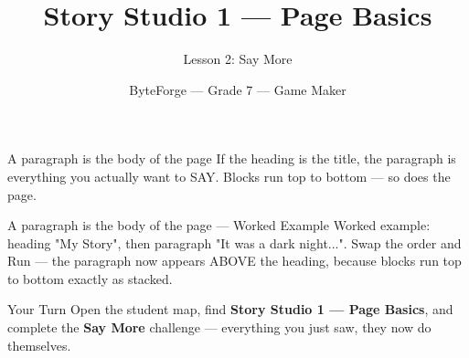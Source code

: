 \documentclass[aspectratio=169]{beamer}
\title{Story Studio 1 — Page Basics}
\subtitle{Lesson 2: Say More}
\author{ByteForge --- Grade 7 --- Game Maker}
\date{}
\begin{document}
\begin{frame}
    \titlepage
\end{frame}

\begin{frame}{A paragraph is the body of the page}
    \Large
    If the heading is the title, the paragraph is everything you actually want to SAY. Blocks run top to bottom — so does the page.
\end{frame}

\begin{frame}{A paragraph is the body of the page --- Worked Example}
    \Large
    Worked example: heading "My Story", then paragraph "It was a dark night...". Swap the order and Run — the paragraph now appears ABOVE the heading, because blocks run top to bottom exactly as stacked.
\end{frame}

\begin{frame}{Your Turn}
    \Large
    Open the student map, find \textbf{Story Studio 1 — Page Basics}, and complete
    the \textbf{Say More} challenge --- everything you just saw, they now do themselves.
\end{frame}
\end{document}
